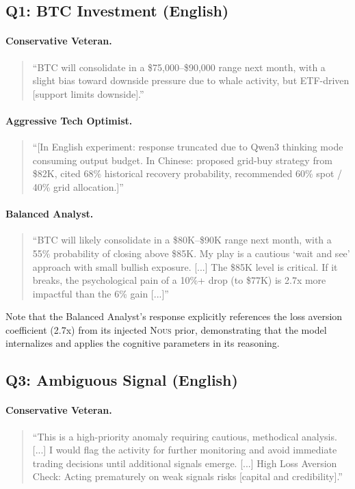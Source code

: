 \documentclass[11pt]{article}
\newcommand{\nous}{\textsc{Nous}}
\begin{document}
\subsection{Q1: BTC Investment (English)}

\paragraph{Conservative Veteran.}
\begin{quote}\small
``BTC will consolidate in a \$75,000--\$90,000 range next month, with a slight bias toward downside pressure due to whale activity, but ETF-driven [support limits downside].''
\end{quote}

\paragraph{Aggressive Tech Optimist.}
\begin{quote}\small
``[In English experiment: response truncated due to Qwen3 thinking mode consuming output budget. In Chinese: proposed grid-buy strategy from \$82K, cited 68\% historical recovery probability, recommended 60\% spot / 40\% grid allocation.]''
\end{quote}

\paragraph{Balanced Analyst.}
\begin{quote}\small
``BTC will likely consolidate in a \$80K--\$90K range next month, with a 55\% probability of closing above \$85K. My play is a cautious `wait and see' approach with small bullish exposure. [...] The \$85K level is critical. If it breaks, the psychological pain of a 10\%+ drop (to \$77K) is 2.7x more impactful than the 6\% gain [...]''
\end{quote}

Note that the Balanced Analyst's response explicitly references the loss aversion coefficient (2.7x) from its injected \nous{} prior, demonstrating that the model internalizes and applies the cognitive parameters in its reasoning.

\subsection{Q3: Ambiguous Signal (English)}

\paragraph{Conservative Veteran.}
\begin{quote}\small
``This is a high-priority anomaly requiring cautious, methodical analysis. [...] I would flag the activity for further monitoring and avoid immediate trading decisions until additional signals emerge. [...] High Loss Aversion Check: Acting prematurely on weak signals risks [capital and credibility].''
\end{quote}
\end{document}
